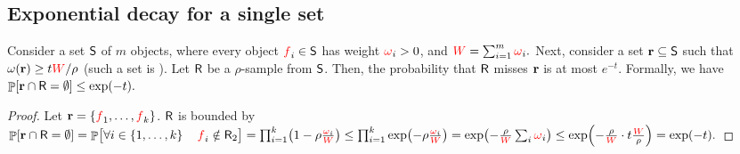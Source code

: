 
\subsection{Exponential decay for a single set}



\begin{lemma}%
    Consider a set $\mathsf{S}$ of $m$ objects, where every object
    ${\textcolor{red}{f}}_i \in \mathsf{S}$ has weight ${\textcolor{red}{\omega}}_i > 0 $, and
    \begin{math}
        {\textcolor{red}{W}}= \sum_{i=1}^m {\textcolor{red}{\omega}}_i.
    \end{math}
    Next, consider a set $\mathbf{r} \subseteq \mathsf{S}$ such that
    $\WeightX{\range} \geq t \TotalW / \rho$ (such a set is
    ). Let $\mathsf{R}$ be a $\rho$-sample from
    $\mathsf{S}$. Then, the probability that $\mathsf{R}$ misses $\mathbf{r}$ is
    at most $e^{-t}$. Formally, we have
    \begin{math}
        \Prob{ \range \cap \Sample = \emptyset} \leq \exp\pth{-t}.
    \end{math}
\end{lemma}

\begin{proof}
    Let $\mathbf{r} = \left\{ {{\textcolor{red}{f}}_1, \ldots, {\textcolor{red}{f}}_k} \right\}$.
    $\mathsf{R}$ 
    is bounded by
    \begin{math}
      \Prob{ \range \cap \Sample = \emptyset}%
      =%
      \Prob{ \bigl. \forall i \in \brc{1,\ldots, k} \quad \obj_i
         \notin \Sample_2}%
      =%
      \prod_{i=1}^k \pth{1 - \rho\frac{\Wg_i}{\TotalW}}%
      \leq %
      \prod_{i=1}^k \exp \pth{ - \rho \frac{\Wg_i}{\TotalW}} %
        =%
        \exp \pth{ - \frac{\rho}{\TotalW} \sum_i \Wg_i } %
        \leq%
        \exp\pth{ - \frac{\rho}{\TotalW} \cdot t \frac{\TotalW}{\rho}
        } = \exp\pth{-t}. %
      \end{math}
\end{proof}

